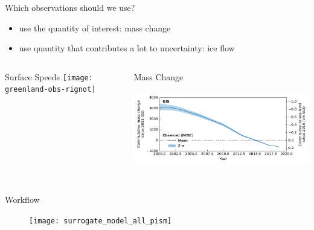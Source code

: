 \documentclass[aspectratio=169,hide notes,intlimits]{beamer}
\begin{document}
\begin{frame}{Which observations should we use?}
    \begin{minipage}[t][1.2cm][t]{\textwidth}
        \begin{itemize}
        \item use the quantity of interest: \alert{mass change}
        \item use quantity that contributes a lot to uncertainty: \alert{ice flow}
        \end{itemize}
  \end{minipage}
    \begin{minipage}[t][10cm][t]{\textwidth}
        \begin{columns}[c]
    \begin{column}{.3\textwidth}
   \begin{block}{Surface Speeds}
    \texttt{[image: greenland-obs-rignot]}
    \end{block}
    \end{column}
    \begin{column}{.65\textwidth}
   \begin{block}{Mass Change}
    \includegraphics[height=4cm]{GIS_hist_only_obs}
    \end{block}
    \end{column}
  \end{columns}
    \end{minipage}
\end{frame}


\begin{frame}{Workflow}
  \vspace{-1.5em}
    \begin{minipage}[t][7.25cm][t]{\textwidth}
    \begin{figure}
      \texttt{[image: surrogate\_model\_all\_pism]}
    \end{figure}
    \end{minipage}
\end{frame}
\end{document}
